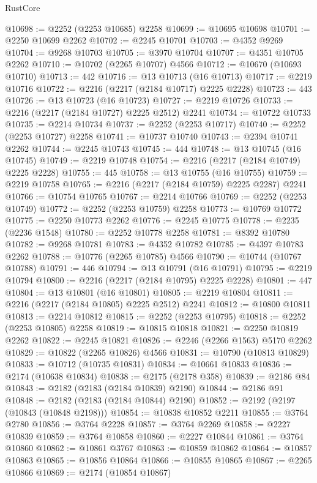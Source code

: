 \begin{lexlean}{RustCore}
\begin{coremodule}
@10698 := @2252 (@2253 @10685) @2258
@10699 := @10695 @10698
@10701 := @2250 @10699 @2262
@10702 := @2245 @10701
@10703 := @4352 @9269
@10704 := @9268 @10703
@10705 := @3970 @10704
@10707 := @4351 @10705 @2262
@10710 := @10702 (@2265 @10707) @4566
@10712 := @10670 (@10693 @10710)
@10713 := 442
@10716 := @13 @10713 (@16 @10713)
@10717 := @2219 @10716
@10722 := @2216 (@2217 (@2184 @10717) @2225 @2228)
@10723 := 443
@10726 := @13 @10723 (@16 @10723)
@10727 := @2219 @10726
@10733 := @2216 (@2217 (@2184 @10727) @2225 @2512) @2241
@10734 := @10722 @10733
@10735 := @2214 @10734
@10737 := @2252 (@2253 @10717)
@10740 := @2252 (@2253 @10727) @2258
@10741 := @10737 @10740
@10743 := @2394 @10741 @2262
@10744 := @2245 @10743
@10745 := 444
@10748 := @13 @10745 (@16 @10745)
@10749 := @2219 @10748
@10754 := @2216 (@2217 (@2184 @10749) @2225 @2228)
@10755 := 445
@10758 := @13 @10755 (@16 @10755)
@10759 := @2219 @10758
@10765 := @2216 (@2217 (@2184 @10759) @2225 @2287) @2241
@10766 := @10754 @10765
@10767 := @2214 @10766
@10769 := @2252 (@2253 @10749)
@10772 := @2252 (@2253 @10759) @2258
@10773 := @10769 @10772
@10775 := @2250 @10773 @2262
@10776 := @2245 @10775
@10778 := @2235 (@2236 @1548)
@10780 := @2252 @10778 @2258
@10781 := @8392 @10780
@10782 := @9268 @10781
@10783 := @4352 @10782
@10785 := @4397 @10783 @2262
@10788 := @10776 (@2265 @10785) @4566
@10790 := @10744 (@10767 @10788)
@10791 := 446
@10794 := @13 @10791 (@16 @10791)
@10795 := @2219 @10794
@10800 := @2216 (@2217 (@2184 @10795) @2225 @2228)
@10801 := 447
@10804 := @13 @10801 (@16 @10801)
@10805 := @2219 @10804
@10811 := @2216 (@2217 (@2184 @10805) @2225 @2512) @2241
@10812 := @10800 @10811
@10813 := @2214 @10812
@10815 := @2252 (@2253 @10795)
@10818 := @2252 (@2253 @10805) @2258
@10819 := @10815 @10818
@10821 := @2250 @10819 @2262
@10822 := @2245 @10821
@10826 := @2246 (@2266 @1563) @5170 @2262
@10829 := @10822 (@2265 @10826) @4566
@10831 := @10790 (@10813 @10829)
@10833 := @10712 (@10735 @10831)
@10834 := @10661 @10833
@10836 := @2174 (@10638 @10834)
@10838 := @2175 (@2178 @358)
@10839 := @2186 @84
@10843 := @2182 (@2183 (@2184 @10839) @2190)
@10844 := @2186 @91
@10848 := @2182 (@2183 (@2184 @10844) @2190)
@10852 := @2192 (@2197 (@10843 (@10848 @2198)))
@10854 := @10838 @10852 @2211
@10855 := @3764 @2780
@10856 := @3764 @2228
@10857 := @3764 @2269
@10858 := @2227 @10839
@10859 := @3764 @10858
@10860 := @2227 @10844
@10861 := @3764 @10860
@10862 := @10861 @3767
@10863 := @10859 @10862
@10864 := @10857 @10863
@10865 := @10856 @10864
@10866 := @10855 @10865
@10867 := @2265 @10866
@10869 := @2174 (@10854 @10867)

\end{coremodule}
\end{lexlean}
